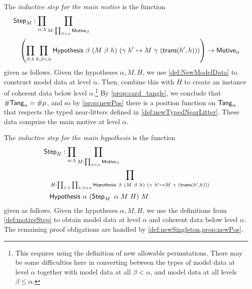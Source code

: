 \begin{definition}
  \label{def:motiveStep}
  The \emph{inductive step for the main motive} is the function
  \begin{align*}
    &\newoperator{Step}_M : \prod_{\alpha : \lambda} \prod_{M : \prod_{\beta < \alpha} \Motive_\beta} \\
    &\quad\left( \prod_{\beta : \lambda} \prod_{h : \beta < \alpha} \Hypothesis\ \beta\ (M\ \beta\ h)\ (\gamma\ h' \mapsto M\ \gamma\ (\newoperator{trans}(h',h))) \right) \to \Motive_\alpha
  \end{align*}
  given as follows.
  Given the hypotheses \( \alpha, M, H \), we use \cref{def:NewModelData} to construct model data at level \( \alpha \).
  Then, combine this with \( H \) to create an instance of coherent data below level \( \alpha \).\footnote{This requires using the definition of new allowable permutations. There may be some difficulties here in converting between the types of model data at level \( \alpha \) together with model data at all \( \beta < \alpha \), and model data at all levels \( \beta \leq \alpha \).}
  By \cref{prop:card_tangle}, we conclude that \( \#\mathsf{Tang}_\alpha = \#\mu \), and so by \cref{prop:newPos} there is a position function on \( \mathsf{Tang}_\alpha \) that respects the typed near-litters defined in \cref{def:newTypedNearLitter}.
  These data comprise the main motive at level \( \alpha \).
\end{definition}
\begin{definition}
  \label{def:hypothesisStep}
  The \emph{inductive step for the main hypothesis} is the function
  \begin{align*}
    &\newoperator{Step}_H : \prod_{\alpha : \lambda} \prod_{M : \prod_{\beta < \alpha} \Motive_\beta} \\
    &\quad\prod_{H : \prod_{\beta : \lambda} \prod_{h : \beta < \alpha} \Hypothesis\ \beta\ (M\ \beta\ h)\ (\gamma\ h' \mapsto M\ \gamma\ (\newoperator{trans}(h',h)))}\\
    &\quad\Hypothesis\ \alpha\ (\newoperator{Step}_M\ \alpha\ M\ H)\ M
  \end{align*}
  given as follows.
  Given the hypotheses \( \alpha, M, H \), we use the definitions from \cref{def:motiveStep} to obtain model data at level \( \alpha \) and coherent data below level \( \alpha \).
  The remaining proof obligations are handled by \cref{def:newSingleton,prop:newPos}.
\end{definition}
